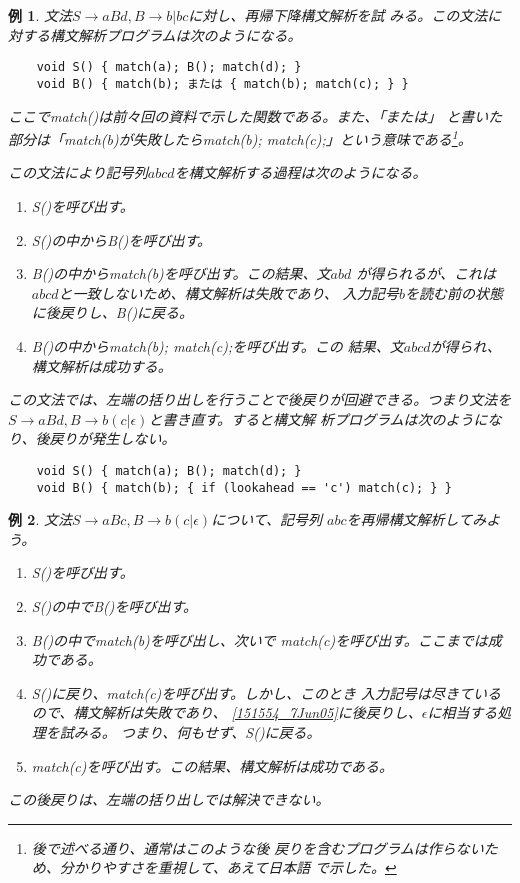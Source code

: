 \documentclass[a4j,10pt]{jsarticle}
\newtheorem{example}{例}
\begin{document}
\begin{screen}
\begin{example}
 文法$S \rightarrow aBd, B\rightarrow b | bc$に対し、再帰下降構文解析を試
 みる。この文法に対する構文解析プログラムは次のようになる。
 \begin{verbatim}
	void S() { match(a); B(); match(d); }
	void B() { match(b); または { match(b); match(c); } }\end{verbatim}
 ここで\textsf{match()}は前々回の資料で示した関数である。また、「または」
 と書いた部分は「\textsf{match(b)}が失敗したら\textsf{match(b);
 match(c);}」という意味である\footnote{後で述べる通り、通常はこのような後
 戻りを含むプログラムは作らないため、分かりやすさを重視して、あえて日本語
 で示した。}。

 この文法により記号列$abcd$を構文解析する過程は次のようになる。
 \begin{enumerate}
  \item \textsf{S()}を呼び出す。
  \item \textsf{S()}の中から\textsf{B()}を呼び出す。
  \item \textsf{B()}の中から\textsf{match(b)}を呼び出す。この結果、文$abd$
	が得られるが、これは$abcd$と一致しないため、構文解析は失敗であり、
	入力記号$b$を読む前の状態に後戻りし、\textsf{B()}に戻る。
  \item \textsf{B()}の中から\textsf{match(b); match(c);}を呼び出す。この
	結果、文$abcd$が得られ、構文解析は成功する。
 \end{enumerate}

 この文法では、左端の括り出しを行うことで後戻りが回避できる。つまり文法を
 $S \rightarrow aBd, B \rightarrow b(c|\epsilon)$と書き直す。すると構文解
 析プログラムは次のようになり、後戻りが発生しない。
 \begin{verbatim}
	void S() { match(a); B(); match(d); }
	void B() { match(b); { if (lookahead == 'c') match(c); } }\end{verbatim}
\end{example}
\end{screen}

\begin{screen}
\begin{example}
 文法$S \rightarrow aBc, B \rightarrow b(c|\epsilon)$について、記号列
 $abc$を再帰構文解析してみよう。
 \begin{enumerate}
  \item \textsf{S()}を呼び出す。
  \item \textsf{S()}の中で\textsf{B()}を呼び出す。
  \item \textsf{B()}の中で\textsf{match(b)}を呼び出し、次いで
	\textsf{match(c)}を呼び出す。ここまでは成功である。
	\label{151554_7Jun05}
  \item \textsf{S()}に戻り、\textsf{match(c)}を呼び出す。しかし、このとき
	入力記号は尽きているので、構文解析は失敗であり、
	\ref{151554_7Jun05}に後戻りし、$\epsilon$に相当する処理を試みる。
	つまり、何もせず、\textsf{S()}に戻る。
  \item \textsf{match(c)}を呼び出す。この結果、構文解析は成功である。
 \end{enumerate}
 この後戻りは、左端の括り出しでは解決できない。
\end{example}
\end{screen}
\end{document}
